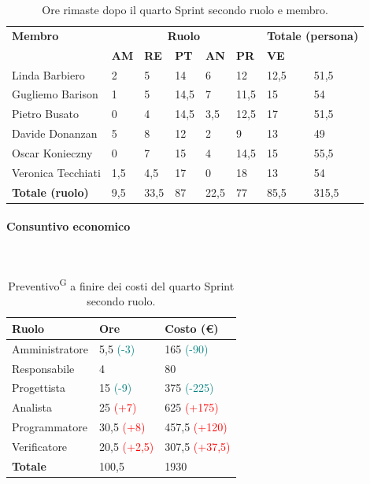 \documentclass[8pt]{article}
\newcommand{\glossterm}[1]{#1\textsuperscript{G}} %
\newcommand{\subsubsubsection}[1]{\paragraph{#1}\mbox{}\\}
\begin{document}
\begin{table}[ht!]
	\centering
	\begin{tabular}{p{3cm} p{1.4cm} p{1.6cm} p{1.5cm} p{1.5cm} p{1.5cm} p{1.5cm} p{2cm}}
		\toprule
        \textbf{Membro} & \multicolumn{5}{c}{\textbf{Ruolo}} & \multicolumn{2}{r}{\textbf{Totale (persona)}}\\
		& \textbf{AM} & \textbf{RE} & \textbf{PT} & \textbf{AN} & \textbf{PR} & \textbf{VE}\\
		\midrule
        Linda Barbiero     & 2 & 5 & 14 & 6 & 12 & 12,5 & 51,5 \\
        Gugliemo Barison   & 1 & 5 & 14,5 & 7 & 11,5 & 15 & 54 \\
        Pietro Busato      & 0 & 4 & 14,5 & 3,5 & 12,5 & 17 & 51,5 \\
        Davide Donanzan    & 5 & 8 & 12 & 2 & 9 & 13 & 49 \\
        Oscar Konieczny    & 0 & 7 & 15 & 4 & 14,5 & 15 & 55,5 \\
        Veronica Tecchiati & 1,5 & 4,5 & 17 & 0 & 18 & 13 & 54 \\
        \midrule
        \textbf{Totale (ruolo)} & 9,5 & 33,5 & 87 & 22,5 & 77 & 85,5 & 315,5 \\
		\bottomrule
	\end{tabular}
	\caption{Ore rimaste dopo il quarto Sprint secondo ruolo e membro.}
	\label{table:Ore rimaste dopo il quarto Sprint secondo ruolo e membro.}
\end{table}
\subsubsubsection{Consuntivo economico}
\begin{table}[ht!]
    \centering
    \begin{tabular}{p{4cm} p{1.8cm} p{2.2cm}}
        \toprule
        \textbf{Ruolo} & \textbf{Ore} & \textbf{Costo (€)} \\
        \midrule
        Amministratore & 5,5 \textcolor{teal}{(-3)} & 165 \textcolor{teal}{(-90)} \\
        Responsabile & 4  & 80 \\
        Progettista & 15 \textcolor{teal}{(-9)}  & 375 \textcolor{teal}{(-225)} \\
        Analista & 25 \textcolor{red}{(+7)} & 625 \textcolor{red}{(+175)} \\
        Programmatore & 30,5 \textcolor{red}{(+8)} & 457,5 \textcolor{red}{(+120)} \\
        Verificatore & 20,5 \textcolor{red}{(+2,5)} & 307,5 \textcolor{red}{(+37,5)} \\
        \bottomrule
        \textbf{Totale} & 100,5 & 1930
    \end{tabular}
    \caption{\glossterm{Preventivo} a finire dei costi del quarto Sprint secondo ruolo.}
    \label{table:Preventivo a finire dei costi del quartoo Sprint secondo ruolo}
\end{table}
\end{document}
